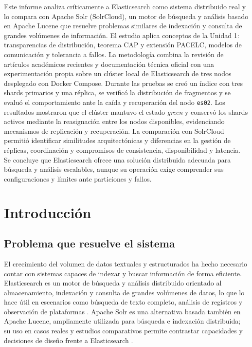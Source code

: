 \documentclass[12pt,a4paper]{article}
\begin{document}
Este informe analiza críticamente a Elasticsearch como sistema distribuido real y lo compara con Apache Solr (SolrCloud), un motor de búsqueda y análisis basado en Apache Lucene que resuelve problemas similares de indexación y consulta de grandes volúmenes de información. El estudio aplica conceptos de la Unidad 1: transparencias de distribución, teorema CAP y extensión PACELC, modelos de comunicación y tolerancia a fallos. La metodología combina la revisión de artículos académicos recientes y documentación técnica oficial con una experimentación propia sobre un clúster local de Elasticsearch de tres nodos desplegado con Docker Compose. Durante las pruebas se creó un índice con tres shards primarios y una réplica, se verificó la distribución de fragmentos y se evaluó el comportamiento ante la caída y recuperación del nodo \texttt{es02}. Los resultados mostraron que el clúster mantuvo el estado \textit{green} y conservó los shards activos mediante la reasignación entre los nodos disponibles, evidenciando mecanismos de replicación y recuperación. La comparación con SolrCloud permitió identificar similitudes arquitectónicas y diferencias en la gestión de réplicas, coordinación y compromisos de consistencia, disponibilidad y latencia. Se concluye que Elasticsearch ofrece una solución distribuida adecuada para búsqueda y análisis escalables, aunque su operación exige comprender sus configuraciones y límites ante particiones y fallos.

\section{Introducción}

\subsection{Problema que resuelve el sistema}
El crecimiento del volumen de datos textuales y estructurados ha hecho necesario contar con sistemas capaces de indexar y buscar información de forma eficiente. Elasticsearch es un motor de búsqueda y análisis distribuido orientado al almacenamiento, indexación y consulta de grandes volúmenes de datos, lo que lo hace útil en escenarios como búsqueda de texto completo, análisis de registros y observación de plataformas \cite{cheresharov-2026,calderon-2023,feraru-2026}. Apache Solr es una alternativa basada también en Apache Lucene, ampliamente utilizada para búsqueda e indexación distribuida; su uso en casos reales y estudios comparativos permite contrastar capacidades y decisiones de diseño frente a Elasticsearch \cite{deniz-2023,lu-2026,unger-2023}.
\end{document}
